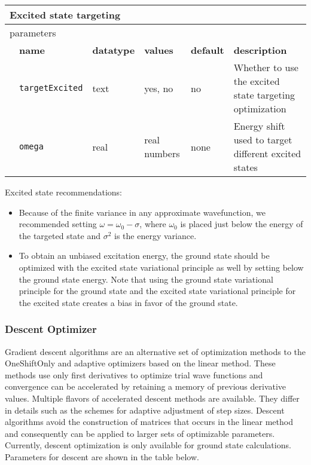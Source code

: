 \begin{table}[h]
\begin{center}
\begin{tabularx}{\textwidth}{l l l l l X }
\hline
\multicolumn{6}{l}{Excited state targeting} \\
\hline
\multicolumn{2}{l}{parameters}  & \multicolumn{4}{l}{}\\
   &   \bfseries name     & \bfseries datatype & \bfseries values & \bfseries default   & \bfseries description \\
   &   \texttt{targetExcited} &  text   & yes, no      & no   & Whether to use the excited state targeting optimization\\
   &   \texttt{omega}         &  real   & real numbers & none & Energy shift used to target different excited states\\
  \hline
\end{tabularx}
\end{center}
\end{table}

Excited state recommendations:
\begin{itemize}
  \item Because of the finite variance in any approximate wavefunction, we recommended setting $\omega=\omega_0-\sigma$, where $\omega_0$ is placed just
        below the energy of the targeted state and $\sigma^2$ is the energy variance.
  \item To obtain an unbiased excitation energy, the ground state should be optimized with the excited state variational principle as well by setting
         below the ground state energy.  Note that using the ground state variational principle for the ground state and the excited state variational
        principle for the excited state creates a bias in favor of the ground state. 
\end{itemize}

\subsubsection{Descent Optimizer}
Gradient descent algorithms are an alternative set of optimization methods to the OneShiftOnly and adaptive optimizers based on the linear method.
These methods use only first derivatives to optimize trial wave functions and convergence can be accelerated by retaining a memory of previous derivative values.
Multiple flavors of accelerated descent methods are available. They differ in details such as the schemes for adaptive adjustment of step sizes.\cite{Otis2019}
Descent algorithms avoid the construction of matrices that occurs in the linear method and consequently can be applied to larger sets of
optimizable parameters.
Currently, descent optimization is only available for ground state calculations.
Parameters for descent are shown in the table below.\\

